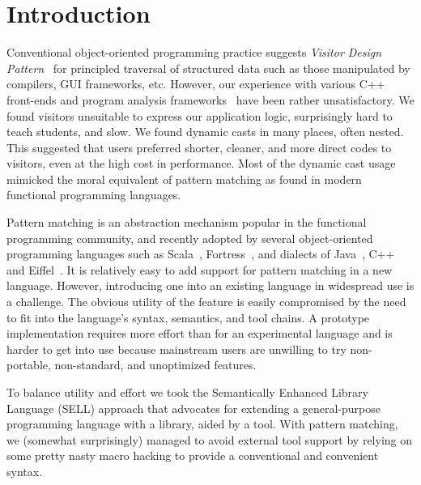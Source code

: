 \section{Introduction} %
\label{sec:intro}

Conventional object-oriented programming practice suggests \emph{Visitor Design 
Pattern}~\cite{DesignPatterns} for principled traversal of structured data such 
as those manipulated by compilers, GUI frameworks, etc. However, our experience 
with various C++ front-ends and program analysis frameworks~\cite{Pivot09,Phoenix,Clang} 
have been rather unsatisfactory. We found visitors unsuitable to express our 
application logic, surprisingly hard to teach students, and slow. We found 
dynamic casts in many places, often nested. This suggested that users preferred 
shorter, cleaner, and more direct codes to visitors, even at the high cost in 
performance. Most of the dynamic cast usage mimicked the moral equivalent of 
pattern matching as found in modern functional programming languages.

Pattern matching is an abstraction mechanism popular in the functional
programming community, and recently adopted by several object-oriented
programming languages such as Scala~\cite{Scala2nd}, Fortress~\cite{RPS10},
and dialects of Java~\cite{Odersky97pizzainto,Liu03jmatch:iterable,HydroJ2003}, 
C++\cite{Prop96} and Eiffel~\cite{Moreau:2003}. It is relatively easy to add 
support for pattern matching in a new language. However, introducing one into an
existing language in widespread use is a challenge. The obvious utility of the 
feature is easily compromised by the need to fit into the language's syntax, 
semantics, and tool chains. A prototype implementation requires more effort than 
for an experimental language and is harder to get into use because mainstream 
users are unwilling to try non-portable, non-standard, and unoptimized features. 

To balance utility and effort we took the Semantically Enhanced Library Language 
(SELL) approach\cite{SELL} that advocates for extending a general-purpose 
programming language with a library, aided by a tool. With pattern matching, we 
(somewhat surprisingly) managed to avoid external tool support by relying on 
some pretty nasty macro hacking to provide a conventional and convenient syntax.

